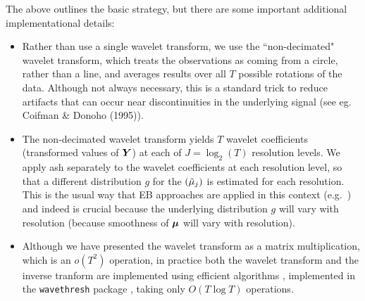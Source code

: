 \documentclass[12pt]{article}
\begin{document}
The above outlines the basic strategy, but there are some important
 additional implementational details:
\begin{itemize}
\item Rather than use a single wavelet transform, we use the ``non-decimated" wavelet transform, which treats the observations as coming
from a circle, rather than a line, and averages results over all $T$ possible rotations of the data. Although not always necessary, this is a standard trick to reduce artifacts that can occur near discontinuities in the underlying signal (see eg. Coifman \& Donoho (1995)). 
\item The non-decimated wavelet transform yields $T$ wavelet coefficients (transformed values of $\bm{Y}$) 
at each of $J=\log_2(T)$ resolution levels.
We apply ash separately to the wavelet coefficients at each resolution level, so that
a different distribution $g$ for the $(\tilde\mu_j)$ is estimated for each resolution. This is the usual way that
EB approaches are applied in this context (e.g.~\cite{checkcgandjs}) and indeed is crucial because
the underlying distribution $g$  will vary with resolution (because smoothness of $\bm{\mu}$ will vary with resolution).  
\item Although we have presented the wavelet transform as a matrix multiplication, which is an $o(T^2)$ operation, in practice both the wavelet transform and the inverse tranform are implemented using
efficient algorithms \cite{beylkin.92,coifman.donoho.94}, implemented in the {\tt wavethresh} package \cite{}, taking only $O(T\log T)$ operations. 
\end{itemize}
\end{document}
